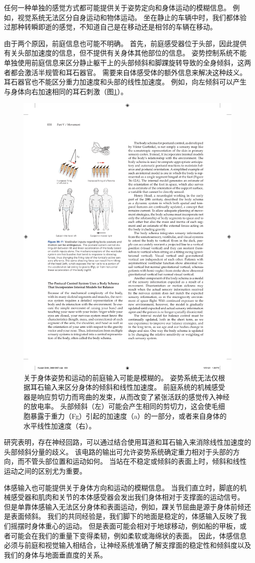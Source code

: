 任何一种单独的感觉方式都可能提供关于姿势定向和身体运动的模糊信息。
例如，视觉系统无法区分自身运动和物体运动。
坐在静止的车辆中时，我们都体验过那种转瞬即逝的感觉，不知道自己是在移动还是相邻的车辆在移动。


由于两个原因，前庭信息也可能不明确。
首先，前庭感受器位于头部，因此提供有关头部加速度的信息，但不提供有关身体其他部位的信息。
姿势控制系统不能单独使用前庭信息来区分静止躯干上的头部倾斜和脚踝旋转导致的全身倾斜，这两者都会激活半规管和耳石器官。
需要来自体感受体的额外信息来解决这种歧义。
耳石器官也不能区分重力加速度和头部的线性加速度。 
例如，向左倾斜可以产生与身体向右加速相同的耳石刺激（图\ref{fig:36_11}）。


\begin{figure}[htbp]
	\centering
	\includegraphics[width=0.45\linewidth]{chap36/fig_36_11}
	\caption{关于身体姿势和运动的前庭输入可能是模糊的。 姿势系统无法仅根据耳石输入来区分身体的倾斜和线性加速度。 前庭系统的机械感受器是响应剪切力而弯曲的发束，从而改变了紧张活跃的感觉传入神经的放电率。 头部倾斜（左）可能会产生相同的剪切力，这会使毛细胞暴露于重力（Fg）引起的加速度（a）的一部分，或者来自身体的水平线性加速度（右）。}
	\label{fig:36_11}
\end{figure}

研究表明，存在神经回路，可以通过结合使用耳道和耳石输入来消除线性加速度的头部倾斜分量的歧义。
该电路的输出可允许姿势系统确定重力相对于头部的方向，而不管头部位置和运动如何。
当站在不稳定或倾斜的表面上时，倾斜和线性运动之间的区别尤为重要。


体感输入也可能提供关于身体方向和运动的模糊信息。
当我们直立时，脚底的机械感受器和肌肉和关节的本体感受器会发出我们身体相对于支撑面的运动信号。
但是单靠体感输入无法区分身体和表面运动，例如，踝关节屈曲是源于身体前倾还是表面倾斜。
我们的共同经验是，我们脚下的地面是稳定的，体感输入反映了我们摇摆时身体重心的运动。
但是表面可能会相对于地球移动，例如船的甲板，或者可能会在我们的重量下变得柔韧，例如柔软或海绵状的表面。
因此，体感信息必须与前庭和视觉输入相结合，让神经系统准确了解支撑面的稳定性和倾斜度以及我们的身体与地面垂直度的关系。



